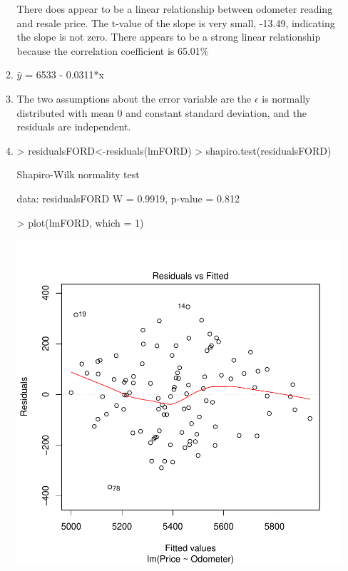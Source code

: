 \documentclass{article}
\begin{document}
\begin{enumerate}
\begin{enumerate}[a]
There does appear to be a linear relationship between odometer reading and resale price. The t-value of the slope is very small, -13.49, indicating the slope is not zero. There appears to be a strong linear relationship because the correlation coefficient is 65.01$\%$

\item 

$\hat{y}$ = 6533 - 0.0311*x

\item The two assumptions about the error variable are the $\epsilon$ is normally distributed with mean 0 and constant standard deviation, and the residuals are independent.

\item
\begin{Schunk}
\begin{Sinput}
> residualsFORD<-residuals(lmFORD)
> shapiro.test(residualsFORD)
\end{Sinput}
\begin{Soutput}
	Shapiro-Wilk normality test

data:  residualsFORD
W = 0.9919, p-value = 0.812
\end{Soutput}
\begin{Sinput}
> plot(lmFORD, which = 1)
\end{Sinput}
\end{Schunk}
\includegraphics{Homework2-004}


\end{enumerate}
\end{enumerate}
\end{document}
